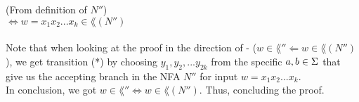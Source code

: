 (From definition of $N''$) \\
$\Longleftrightarrow w=x_1 x_2 . . . x_k \in \lang(N'')$ \\
\\
Note that when looking at the proof in the direction of - ($w \in \lang'' \Longleftarrow  w \in \lang(N'')$),
we get transition (*) by choosing  $y_1,y_2,...y_{2k}$ from the specific $a,b \in \Sigma$ that give us the
accepting branch in the NFA $N''$ for input $w=x_1 x_2 ... x_k$.
\\

In conclusion, we got $w \in \lang'' \Longleftrightarrow  w \in \lang(N'')$. Thus, concluding the proof. \\


